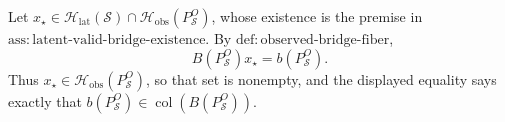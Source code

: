 Let \(x_\star\in\mathcal H_{\mathrm{lat}}(\mathcal S)\cap
\mathcal H_{\mathrm{obs}}(P_{\mathcal S}^O)\), whose existence is the premise in
\(\mathrm{ass{:}latent\text{-}valid\text{-}bridge\text{-}existence}\).  By
\(\mathrm{def{:}observed\text{-}bridge\text{-}fiber}\),
\[
 B(P_{\mathcal S}^O)x_\star=b(P_{\mathcal S}^O).
\]
Thus \(x_\star\in\mathcal H_{\mathrm{obs}}(P_{\mathcal S}^O)\), so that set is
nonempty, and the displayed equality says exactly that
\(b(P_{\mathcal S}^O)\in\operatorname{col}(B(P_{\mathcal S}^O))\).